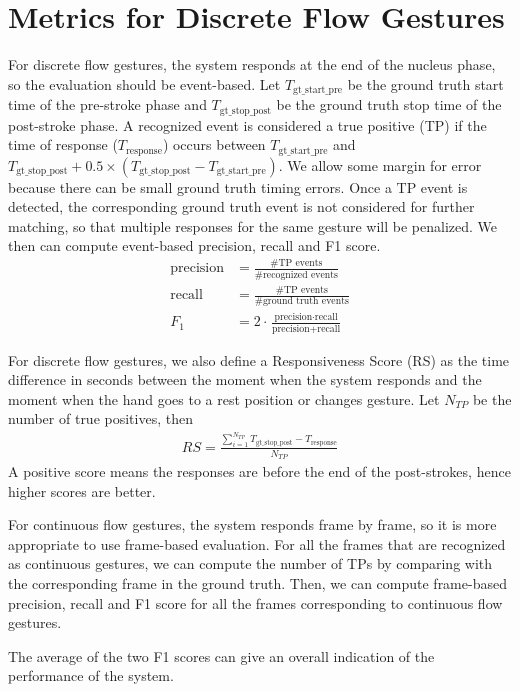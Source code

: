 \section{Metrics for Discrete Flow Gestures}
For discrete flow gestures, the system responds at the end of the nucleus phase,
so the evaluation should be event-based. Let $T_{{\text{gt\_start\_pre}}}$ be
the ground truth start time of the pre-stroke phase and
$T_{{\text{gt\_stop\_post}}}$ be the ground truth stop time of the post-stroke
phase.
A recognized event is considered a true positive (TP) if the time of response ($T_{\text{response}}$) 
occurs between $T_{{\text{gt\_start\_pre}}}$ and $T_{{\text{gt\_stop\_post}}} +
0.5\times(T_{{\text{gt\_stop\_post}}} - T_{\text{gt\_start\_pre}})$. We allow
some margin for error because there can be small ground truth timing errors.
Once a TP event is detected, the corresponding ground truth event is not
considered for further matching, so that multiple responses for the same gesture
will be penalized. We then can compute event-based precision, recall and F1 score.
\begin{align}
\text{precision} &=\frac{\text{\# TP events}}{\text{\# recognized events}} \\
\text{recall} &=\frac{\text{\# TP events}}{\text{\# ground truth events}} \\
F_1 &= 2\cdot \frac{\text{precision} \cdot \text{recall}}{\text{precision} +
\text{recall}}
\end{align}

For discrete flow gestures, we also define a Responsiveness Score (RS) as the
time difference in seconds between the moment when the system responds and the moment when the hand goes to a rest
position or changes gesture. Let $N_{TP}$ be the number of true positives, then
\begin{align}
RS = \frac{\sum_{i = 1}^{N_{TP}}T_{{\text{gt\_stop\_post}}} -
T_{\text{response}}}{N_{TP}}
\end{align}
A positive score means the responses are before the end of the post-strokes,
hence higher scores are better.

For continuous flow gestures, the system responds frame by frame,
so it is more appropriate to use frame-based evaluation. For all the frames that are
recognized as continuous gestures, we can compute the number of TPs by
comparing with the corresponding frame in the ground truth. Then, we can
compute frame-based precision, recall and F1 score for all the frames
corresponding to continuous flow gestures.

The average of the two F1 scores can give an overall indication of the
performance of the system.
